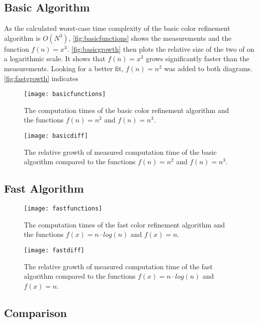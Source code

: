 \documentclass[twoside]{article}
\begin{document}
\begin{multicols}{2}
\subsection{Basic Algorithm}
As the calculated worst-case time complexity of the basic color refinement algorithm is $O(N^3)$, \autoref{fig:basicfunctions} shows the measurements and the function $f(n)=x^3$. \autoref{fig:basicgrowth} then plots the relative size of the two of on a logarithmic scale. It shows that $f(n)=x^3$ grows significantly faster than the measurements. Looking for a better fit, $f(n)=n^2$ was added to both diagrams. \autoref{fig:fastgrowth} indicates 

\begin{figure}[H]
	\texttt{[image: basicfunctions]}
	\caption{The computation times of the basic color refinement algorithm and the functions $f(n)=n^2$ and $f(n)=n^3$.}
	\label{fig:basicfunctions}
\end{figure}

\begin{figure}[H]
	\texttt{[image: basicdiff]}
	\caption{The relative growth of measured computation time of the basic algorithm compared to the functions $f(n)=n^2$ and $f(n)=n^3$.}
	\label{fig:basicgrowth}
\end{figure}

\subsection{Fast Algorithm}

\begin{figure}[H]
	\texttt{[image: fastfunctions]}
	\caption{The computation times of the fast color refinement algorithm and the functions $f(x)=n\cdot log(n)$ and $f(x)=n$.}
	\label{fig:fastfunctions}
\end{figure}

\begin{figure}[H]
	\texttt{[image: fastdiff]}
	\caption{The relative growth of measured computation time of the fast algorithm compared to the functions $f(x)=n\cdot log(n)$ and $f(x)=n$.}
	\label{fig:fastgrowth}
\end{figure}

\subsection{Comparison}


\end{multicols}
\end{document}
